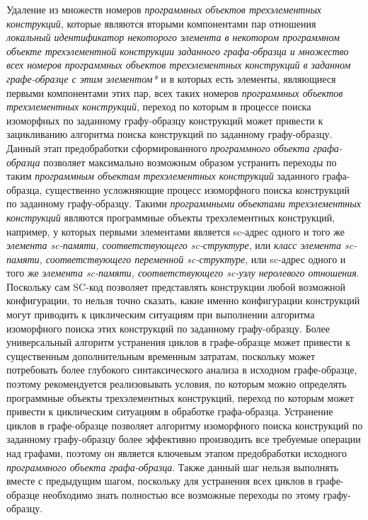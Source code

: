 \begin{textitemize}
	\item Удаление из множеств номеров \textit{программных объектов трехэлементных конструкций}, которые являются вторыми компонентами пар отношения \textit{локальный идентификатор некоторого элемента в некотором программном объекте трехэлементной конструкции заданного графа-образца и множество всех номеров программных объектов трехэлементных конструкций в заданном графе-образце с этим элементом*} и в которых есть элементы, являющиеся первыми компонентами этих пар, всех таких номеров \textit{программных объектов трехэлементных конструкций}, переход по которым в процессе поиска изоморфных по заданному графу-образцу конструкций может привести к зацикливанию алгоритма поиска конструкций по заданному графу-образцу. Данный этап предобработки сформированного \textit{программного объекта графа-образца} позволяет максимально возможным образом устранить переходы по таким \textit{программным объектам трехэлементных конструкций} заданного графа-образца, существенно усложняющие процесс изоморфного поиска конструкций по заданному графу-образцу. Такими \textit{программными объектами трехэлементных конструкций} являются программные объекты трехэлементных конструкций, например, у которых первыми элементами является sc-адрес одного и того же \textit{элемента sc-памяти, соответствующего sc-структуре}, или \textit{класс элемента sc-памяти\scnsupergroupsign, соответствующего переменной sc-структуре}, или sc-адрес одного и того же \textit{элемента sc-памяти, соответствующего sc-узлу неролевого отношения}. Поскольку сам SC-код позволяет представлять конструкции любой возможной конфигурации, то нельзя точно сказать, какие именно конфигурации конструкций могут приводить к циклическим ситуациям при выполнении алгоритма изоморфного поиска этих конструкций по заданному графу-образцу. Более универсальный алгоритм устранения циклов в графе-образце может привести к существенным дополнительным временным затратам, поскольку может потребовать более глубокого синтаксического анализа в исходном графе-образце, поэтому рекомендуется реализовывать условия, по которым можно определять программные объекты трехэлементных конструкций, переход по которым может привести к циклическим ситуациям в обработке графа-образца. Устранение циклов в графе-образце позволяет алгоритму изоморфного поиска конструкций по заданному графу-образцу более эффективно производить все требуемые операции над графами, поэтому он является ключевым этапом предобработки исходного \textit{программного объекта графа-образца}. Также данный шаг нельзя выполнять вместе с предыдущим шагом, поскольку для устранения всех циклов в графе-образце необходимо знать полностью все возможные переходы по этому графу-образцу.

\end{textitemize}

